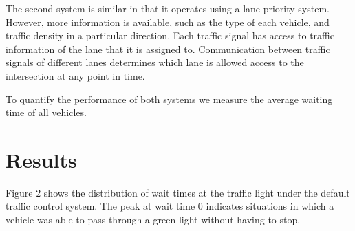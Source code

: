 \documentclass{article}
\begin{document}
The second system is similar in that it operates using a lane priority system. However, more information is available, such as the type of each vehicle, and traffic density in a particular direction. Each traffic signal has access to traffic information of the lane that it is assigned to. Communication between traffic signals of different lanes determines which lane is allowed access to the intersection at any point in time.

To quantify the performance of both systems we measure the average waiting time of all vehicles.

\section{Results}
Figure 2 shows the distribution of wait times at the traffic light under the default traffic control system. The peak at wait time 0 indicates situations in which a vehicle was able to pass through a green light without having to stop.
\end{document}
